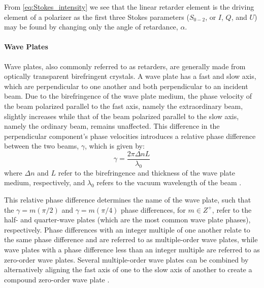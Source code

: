 From \autoref{eq:Stokes_intensity} we see that the linear retarder element is the driving element of a polarizer as the first three Stokes parameters ($S_{0-2}$, or $I$, $Q$, and $U$) may be found by changing only the angle of retardance, $\alpha$.

\paragraph{Wave Plates}
Wave plates, also commonly referred to as retarders, are generally made from optically transparent birefringent crystals. A wave plate has a fast and slow axis, which are perpendicular to one another and both perpendicular to an incident beam. Due to the birefringence of the wave plate medium, the phase velocity of the beam polarized parallel to the fast axis, namely the extraordinary beam, slightly increases while that of the beam polarized parallel to the slow axis, namely the ordinary beam, remains unaffected. This difference in the perpendicular component's phase velocities introduces a relative phase difference between the two beams, $\gamma$, which is given by:
\begin{equation}
    \gamma = \frac{2 \pi \Delta n L}{\lambda_{0}}
\end{equation}
where $\Delta n$ and $L$ refer to the birefringence and thickness of the wave plate medium, respectively, and $\lambda_{0}$ refers to the vacuum wavelength of the beam \citep{Hecht_optics}.

This relative phase difference determines the name of the wave plate, such that the $\gamma = m(\pi/2) $ and $\gamma = m(\pi/4)$ phase differences, for $m \in Z^{+}$, refer to the half- and quarter-wave plates (which are the most common wave plate phases), respectively. Phase differences with an integer multiple of one another relate to the same phase difference and are referred to as multiple-order wave plates, while wave plates with a phase difference less than an integer multiple are referred to as zero-order wave plates. Several multiple-order wave plates can be combined by alternatively aligning the fast axis of one to the slow axis of another to create a compound zero-order wave plate \citep{Hale_birefringence}.

